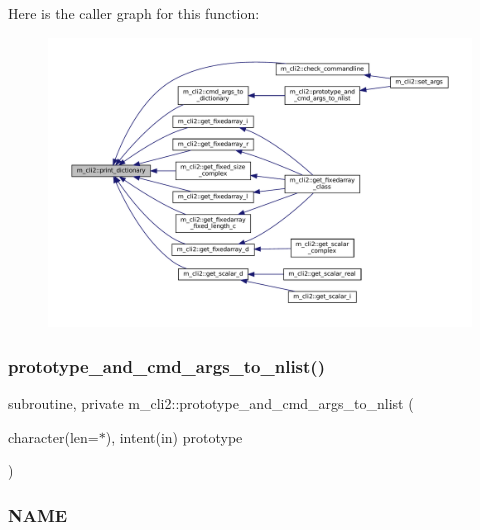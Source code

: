 Here is the caller graph for this function\+:\nopagebreak
\begin{figure}[H]
\begin{center}
\leavevmode
\includegraphics[width=350pt]{namespacem__cli2_af7dc9c4b19e394533df4a8ef42fa111b_icgraph}
\end{center}
\end{figure}
\mbox{\label{namespacem__cli2_a30083aabd53a9db9794ecbd23c2226d0}} 
\subsubsection{\texorpdfstring{prototype\+\_\+and\+\_\+cmd\+\_\+args\+\_\+to\+\_\+nlist()}{prototype\_and\_cmd\_args\_to\_nlist()}}
{\footnotesize\ttfamily subroutine, private m\+\_\+cli2\+::prototype\+\_\+and\+\_\+cmd\+\_\+args\+\_\+to\+\_\+nlist (\begin{DoxyParamCaption}\item[{character(len=$\ast$), intent(in)}]{prototype }\end{DoxyParamCaption})\hspace{0.3cm}{\ttfamily [private]}}



\subsubsection*{N\+A\+ME}

